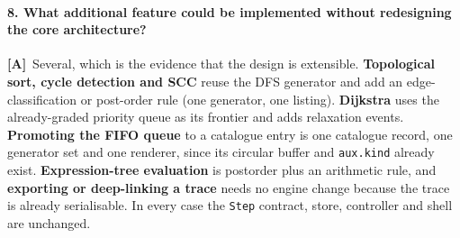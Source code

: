 \documentclass[11pt,a4paper]{article}
\newcommand{\A}{\textcolor{asmc}{\textbf{[A]}}}     %
\newcommand{\ct}[1]{\texttt{#1}}
\begin{document}
\paragraph{8. What additional feature could be implemented without redesigning the core
architecture?}
\A\ Several, which is the evidence that the design is extensible. \textbf{Topological sort,
cycle detection and SCC} reuse the DFS generator and add an edge-classification or post-order
rule (one generator, one listing). \textbf{Dijkstra} uses the already-graded priority queue as
its frontier and adds relaxation events. \textbf{Promoting the FIFO queue} to a catalogue entry
is one catalogue record, one generator set and one renderer, since its circular buffer and
\ct{aux.kind} already exist. \textbf{Expression-tree evaluation} is postorder plus an arithmetic
rule, and \textbf{exporting or deep-linking a trace} needs no engine change because the trace is
already serialisable. In every case the \ct{Step} contract, store, controller and shell are
unchanged.

\end{document}
